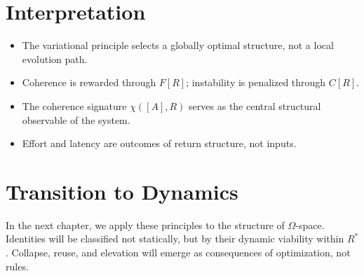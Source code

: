 \section{Interpretation}

\begin{itemize}
    \item The variational principle selects a globally optimal structure, not a local evolution path.
    \item Coherence is rewarded through $F[R]$; instability is penalized through $C[R]$.
    \item The coherence signature $\chi([A], R)$ serves as the central structural observable of the system.
    \item Effort and latency are outcomes of return structure, not inputs.
\end{itemize}

\section{Transition to Dynamics}

In the next chapter, we apply these principles to the structure of $\Omega$-space. Identities will be classified not statically, but by their dynamic viability within $R^*$. Collapse, reuse, and elevation will emerge as consequences of optimization, not rules.

